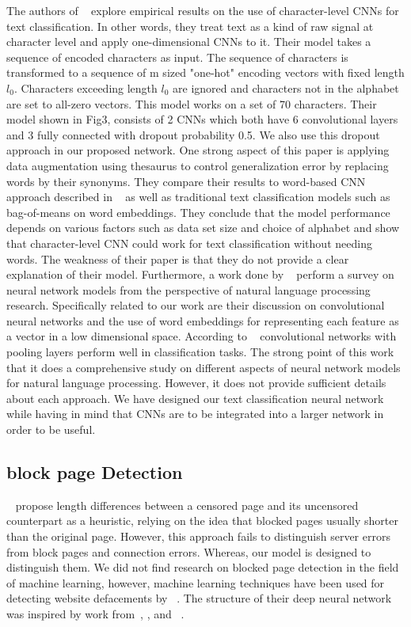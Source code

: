 \documentclass{article} %
\begin{document}
The authors of ~\cite{nips_text} explore empirical results on the use of character-level CNNs for text classification. In other words, they treat text as a kind of raw signal at character level and apply one-dimensional CNNs to it. Their model takes a sequence of encoded characters as input. The sequence of characters is transformed to a sequence of m sized "one-hot" encoding vectors with fixed length $l_0$. Characters exceeding length $l_0$ are ignored and characters not in the alphabet are set to all-zero vectors. This model works on a set of 70 characters. Their model shown in Fig3, consists of 2 CNNs which both have 6 convolutional layers and 3 fully connected with dropout probability 0.5. We also use this dropout approach in our proposed network. One strong aspect of this paper is applying data augmentation using thesaurus to control generalization error by replacing words by their synonyms. They compare their results to word-based CNN approach described in ~\cite{convtext} as well as traditional text classification models such as bag-of-means on word embeddings. They conclude that the model performance depends on various factors such as data set size and choice of alphabet and show that character-level CNN could work for text classification without needing words. The weakness of their paper is that they do not provide a clear explanation of their model.
Furthermore, a work done by ~\cite{nn_survery}  perform a survey on neural network models from the perspective of natural language processing research. Specifically related to our work are their discussion on convolutional neural networks and the use of word embeddings for representing each feature as a vector in a low dimensional space. According to ~\cite{} convolutional networks with pooling layers perform well in classification tasks. The strong point of this work that it does a comprehensive study on different aspects of neural network models for natural language processing. However, it does not provide sufficient details about each approach. We have designed our text classification neural network while having in mind that  CNNs are to be integrated into a larger network in order to be useful.
\subsection{block page Detection}
~\parencite{imc14_phillipa} propose length differences between a censored page and its uncensored counterpart as a heuristic, 
relying on the idea that blocked pages usually shorter than the original page. However, this approach fails to distinguish server errors from block pages and connection errors. Whereas, our model is designed to distinguish them.
We did not find research on blocked page detection in the field of machine learning, however, machine learning techniques have been used for detecting website defacements by ~\parencite{meerkat}. The structure of their deep neural network was inspired by work from~\parencite{imagehinton}, \parencite{nipsandrewng}, and ~\parencite{icml_unsupervised}.
\end{document}
